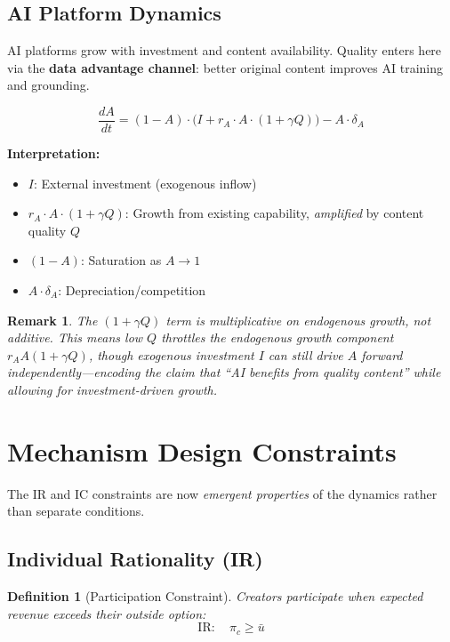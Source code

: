 \documentclass[11pt,a4paper]{article}
\newtheorem{definition}{Definition}
\newtheorem{remark}{Remark}
\begin{document}
\subsection{AI Platform Dynamics}

AI platforms grow with investment and content availability. Quality enters here via the \textbf{data advantage channel}: better original content improves AI training and grounding.

\begin{equation}
\boxed{
\frac{dA}{dt} = (1-A) \cdot \Big( I + r_A \cdot A \cdot (1 + \gamma Q) \Big) - A \cdot \delta_A
}
\end{equation}

\textbf{Interpretation:}
\begin{itemize}
    \item $I$: External investment (exogenous inflow)
    \item $r_A \cdot A \cdot (1 + \gamma Q)$: Growth from existing capability, \emph{amplified} by content quality $Q$
    \item $(1-A)$: Saturation as $A \rightarrow 1$
    \item $A \cdot \delta_A$: Depreciation/competition
\end{itemize}

\begin{remark}
The $(1 + \gamma Q)$ term is multiplicative on \emph{endogenous} growth, not additive. This means low $Q$ throttles the endogenous growth component $r_A A(1+\gamma Q)$, though exogenous investment $I$ can still drive $A$ forward independently---encoding the claim that ``AI benefits from quality content'' while allowing for investment-driven growth.
\end{remark}

\section{Mechanism Design Constraints}

The IR and IC constraints are now \emph{emergent properties} of the dynamics rather than separate conditions.

\subsection{Individual Rationality (IR)}

\begin{definition}[Participation Constraint]
Creators participate when expected revenue exceeds their outside option:
\begin{equation}
\text{IR}: \quad \pi_c \geq \bar{u}
\end{equation}
\end{definition}
\end{document}
